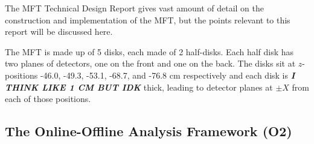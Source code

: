 \documentclass[11pt]{article}
\numberwithin{equation}{section}
\numberwithin{figure}{section}
\numberwithin{table}{section}
\begin{document}
The MFT Technical Design Report \cite{MFT_TDR} gives vast amount of detail on the construction and implementation of the MFT, but the points relevant to this report will be discussed here.

The MFT is made up of 5 disks, each made of 2 half-disks. Each half disk has two planes of detectors, one on the front and one on the back. The disks sit at $z$-positions -46.0, -49.3, -53.1, -68.7, and -76.8 \si{\centi\metre} respectively and each disk is \textit{\textbf{I THINK LIKE 1 CM BUT IDK}} thick, leading to detector planes at $\pm X$ from each of those positions. 






\subsection{The Online-Offline Analysis Framework (O2)}




\printbibliography
\end{document}
